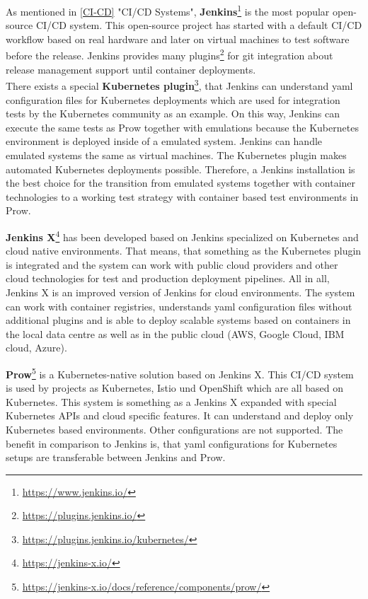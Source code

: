 As mentioned in \ref{CI-CD} "\gls{CI/CD} Systems", \textbf{Jenkins}\footnote{\url{https://www.jenkins.io/}} is the most popular open-source \gls{CI/CD} system. This open-source project has started with a default \gls{CI/CD} workflow based on real hardware and later on virtual machines to test software before the release. Jenkins provides many plugins\footnote{\url{https://plugins.jenkins.io/}} for git integration about release management support until container deployments. \\
There exists a special \textbf{Kubernetes plugin}\footnote{\url{https://plugins.jenkins.io/kubernetes/}}, that Jenkins can understand yaml configuration files for Kubernetes deployments which are used for integration tests by the Kubernetes community as an example. On this way, Jenkins can execute the same tests as Prow together with emulations because the Kubernetes environment is deployed inside of a emulated system. Jenkins can handle emulated systems the same as virtual machines. The Kubernetes plugin makes automated Kubernetes deployments possible. Therefore, a Jenkins installation is the best choice for the transition from emulated systems together with container technologies to a working test strategy with container based test environments in Prow.

\textbf{Jenkins X}\footnote{\url{https://jenkins-x.io/}} has been developed based on Jenkins specialized on Kubernetes and cloud native environments. That means, that something as the Kubernetes plugin is integrated and the system can work with public cloud providers and other cloud technologies for test and production deployment pipelines. All in all, Jenkins X is an improved version of Jenkins for cloud environments. The system can work with container registries, understands yaml configuration files without additional plugins and is able to deploy scalable systems based on containers in the local data centre as well as in the public cloud (AWS, Google Cloud, IBM cloud, Azure).

\textbf{Prow}\footnote{\url{https://jenkins-x.io/docs/reference/components/prow/}} is a Kubernetes-native solution based on Jenkins X. This \gls{CI/CD} system is used by projects as Kubernetes, Istio und OpenShift which are all based on Kubernetes. This system is something as a Jenkins X expanded with special Kubernetes APIs and cloud specific features. It can understand and deploy only Kubernetes based environments. Other configurations are not supported. The benefit in comparison to Jenkins is, that yaml configurations for Kubernetes setups are transferable between Jenkins and Prow.

